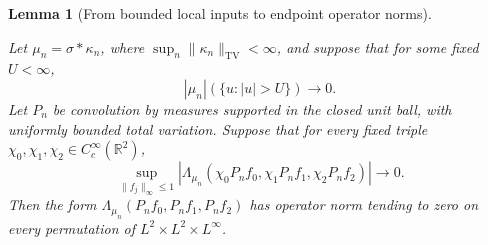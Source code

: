 \documentclass[11pt]{amsart}
\newcommand{\R}{\mathbb R}
\newtheorem{lemma}[theorem]{Lemma}
\theoremstyle{definition}
\theoremstyle{remark}
\numberwithin{equation}{section}
\providecommand{\lean}[1]{}
\providecommand{\leanok}{}
\begin{document}
\begin{lemma}[From bounded local inputs to endpoint operator norms]
\label{ann:localize}
\lean{Auto.ann_localize}
\leanok
Let $\mu_n=\sigma*\kappa_n$, where
$\sup_n\|\kappa_n\|_{\mathrm{TV}}<\infty$, and suppose that for
some fixed $U<\infty$,
\[
 |\mu_n|(\{u:|u|>U\})\longrightarrow0.
\]
Let $P_n$ be convolution by measures supported in the closed unit
ball, with uniformly bounded total variation. Suppose that for
every fixed triple $\chi_0,\chi_1,\chi_2\in C_c^\infty(\R^2)$,
\begin{equation}\label{ann:bounded-local-hyp}
 \sup_{\|f_j\|_\infty\le1}
 |\Lambda_{\mu_n}(\chi_0P_nf_0,\chi_1P_nf_1,\chi_2P_nf_2)|
 \longrightarrow0.
\end{equation}
Then the form
$\Lambda_{\mu_n}(P_nf_0,P_nf_1,P_nf_2)$ has operator norm
tending to zero on every permutation of
$L^2\times L^2\times L^\infty$.
\end{lemma}
\end{document}
